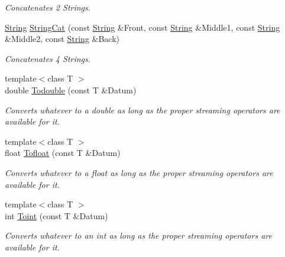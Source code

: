 \begin{DoxyCompactItemize}
\begin{DoxyCompactList}\small\item\em Concatenates 2 Strings. \item\end{DoxyCompactList}\item 
\hyperlink{namespacephys_aa03900411993de7fbfec4789bc1d392e}{String} \hyperlink{namespacephys_aa023584b6c0b8daa4b6abb9108d6e917}{StringCat} (const \hyperlink{namespacephys_aa03900411993de7fbfec4789bc1d392e}{String} \&Front, const \hyperlink{namespacephys_aa03900411993de7fbfec4789bc1d392e}{String} \&Middle1, const \hyperlink{namespacephys_aa03900411993de7fbfec4789bc1d392e}{String} \&Middle2, const \hyperlink{namespacephys_aa03900411993de7fbfec4789bc1d392e}{String} \&Back)
\begin{DoxyCompactList}\small\item\em Concatenates 4 Strings. \item\end{DoxyCompactList}\item 
{\footnotesize template$<$class T $>$ }\\double \hyperlink{namespacephys_aa89192e0bb495fdf141649f5abd88963}{Todouble} (const T \&Datum)
\begin{DoxyCompactList}\small\item\em Converts whatever to a double as long as the proper streaming operators are available for it. \item\end{DoxyCompactList}\item 
{\footnotesize template$<$class T $>$ }\\float \hyperlink{namespacephys_a8f892c12296033f70cc95c43f5c7e85c}{Tofloat} (const T \&Datum)
\begin{DoxyCompactList}\small\item\em Converts whatever to a float as long as the proper streaming operators are available for it. \item\end{DoxyCompactList}\item 
{\footnotesize template$<$class T $>$ }\\int \hyperlink{namespacephys_af0a6dfb0aa9e9292b96a0273e1f49d3a}{Toint} (const T \&Datum)
\begin{DoxyCompactList}\small\item\em Converts whatever to an int as long as the proper streaming operators are available for it. \item\end{DoxyCompactList}\item 

\end{DoxyCompactItemize}
